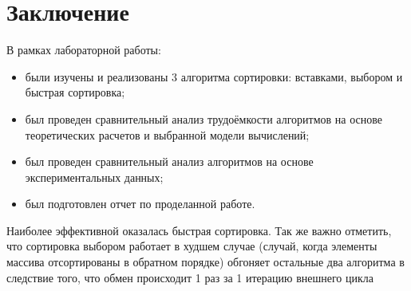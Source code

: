 \chapter*{Заключение}

В рамках лабораторной работы:
\begin{itemize}
	\item были изучены и реализованы 3 алгоритма сортировки: вставками, выбором и быстрая сортировка;
	\item был проведен сравнительный анализ трудоёмкости алгоритмов на основе теоретических расчетов и выбранной модели вычислений;
	\item был проведен сравнительный анализ алгоритмов на основе экспериментальных данных;
    \item был подготовлен отчет по проделанной работе.
\end{itemize}

Наиболее эффективной оказалась быстрая сортировка. Так же важно отметить, что сортировка выбором работает в
худшем случае (случай, когда элементы массива отсортированы в обратном
порядке) обгоняет остальные два алгоритма в следствие того, что обмен
происходит 1 раз за 1 итерацию внешнего цикла